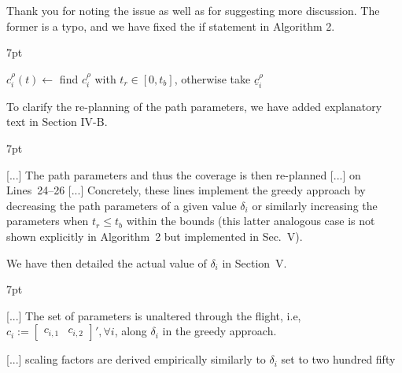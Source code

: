 \documentclass[10pt]{letter}
\newenvironment{formal}{%
  \def\FrameCommand{%
    \hspace{1pt}%
    {\color{red}\vrule width 2pt}%
    {\color{formalshade}\vrule width 4pt}%
    \colorbox{formalshade}%
  }%
  \MakeFramed{\advance\hsize-\width\FrameRestore}%
  \noindent\hspace{-4.55pt}%
  \begin{adjustwidth}{}{7pt}%
  \vspace{2pt}\vspace{2pt}%
}
{%
  \vspace{2pt}\end{adjustwidth}\endMakeFramed%
}
\begin{document}
{\color{blue} 

{\hspace*{-4.5em}{[R1:5]}\vspace*{-1.9em}}

Thank you for noting the issue as well as for suggesting more discussion. The former is a typo, and we have fixed the if statement in Algorithm 2.

\begin{formal}
  \begin{algorithmic}[1]
    \small
      \makeatletter
      \setcounter{ALC@line}{24}
      \makeatother
        \color{blue}\STATE $c_i^{\rho}(t)\gets${ find }$c_i^{\rho}${ with }$t_r\in[0,t_b]${, otherwise take }$\underline{c}_i^\rho$\vspace*{.3ex}\label{alg:traj2}
      \color{black}\ENDIF
      \vspace*{.8ex}
    \end{algorithmic}
  \end{formal}  

  To clarify the re-planning of the path parameters, we have added explanatory text in Section IV-B.

  \begin{formal}
    \color{black} [...] The {\color{blue}path parameters and thus the} coverage is then re{\color{blue}-}planned [...] on Lines~{\color{red}24}--{\color{red}26} [...] {\color{blue}Concretely, these lines implement the greedy approach by decreasing the path parameters of a given value $\delta_i$ or similarly increasing the parameters when $t_r\leq t_b$ within the bounds (this latter analogous case is not shown explicitly in Algorithm~{\color{red}2} but implemented in Sec.~{\color{red}V})}.
    \vspace*{1ex}
  \end{formal}

  We have then detailed the actual value of $\delta_i$ in Section~V.

  \begin{formal}
    \color{black} [...] The set of parameters is unaltered through the flight, i.e, $c_i:=\begin{bmatrix}c_{i,1}&c_{i,2}\end{bmatrix}',\forall i${\color{blue}, along $\delta_i$ %
    in the greedy approach}.
    
    [...] scaling factors are derived empirically %
    {\color{blue}similarly to $\delta_i$ set to two hundred fifty}
    \vspace*{1ex}
  \end{formal}
}
\end{document}
